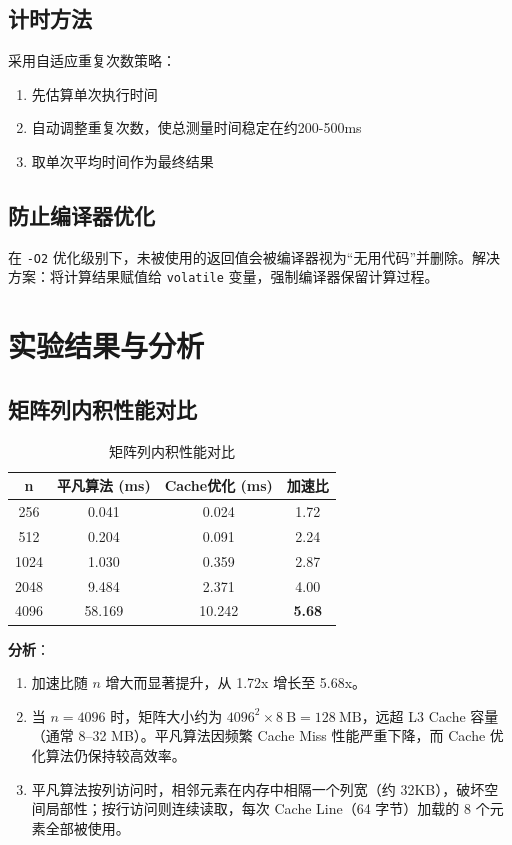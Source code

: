 \documentclass[11pt,a4paper]{article}
\begin{document}
\subsection{计时方法}

采用自适应重复次数策略：
\begin{enumerate}
    \item 先估算单次执行时间
    \item 自动调整重复次数，使总测量时间稳定在约200-500ms
    \item 取单次平均时间作为最终结果
\end{enumerate}

\subsection{防止编译器优化}

在 \texttt{-O2} 优化级别下，未被使用的返回值会被编译器视为“无用代码”并删除。解决方案：将计算结果赋值给 \texttt{volatile} 变量，强制编译器保留计算过程。

\section{实验结果与分析}

\subsection{矩阵列内积性能对比}

\begin{table}[h]
\centering
\caption{矩阵列内积性能对比}
\begin{tabular}{|c|c|c|c|}
\hline
\textbf{n} & \textbf{平凡算法 (ms)} & \textbf{Cache优化 (ms)} & \textbf{加速比} \\
\hline
256 & 0.041 & 0.024 & 1.72 \\
\hline
512 & 0.204 & 0.091 & 2.24 \\
\hline
1024 & 1.030 & 0.359 & 2.87 \\
\hline
2048 & 9.484 & 2.371 & 4.00 \\
\hline
4096 & 58.169 & 10.242 & \textbf{5.68} \\
\hline
\end{tabular}
\end{table}

\textbf{分析}：
\begin{enumerate}
    \item 加速比随 \(n\) 增大而显著提升，从 1.72x 增长至 5.68x。
    \item 当 \(n=4096\) 时，矩阵大小约为 \(4096^2 \times 8\ \text{B} = 128\ \text{MB}\)，远超 L3 Cache 容量（通常 8–32 MB）。平凡算法因频繁 Cache Miss 性能严重下降，而 Cache 优化算法仍保持较高效率。
    \item 平凡算法按列访问时，相邻元素在内存中相隔一个列宽（约 32KB），破坏空间局部性；按行访问则连续读取，每次 Cache Line（64 字节）加载的 8 个元素全部被使用。
\end{enumerate}
\end{document}
